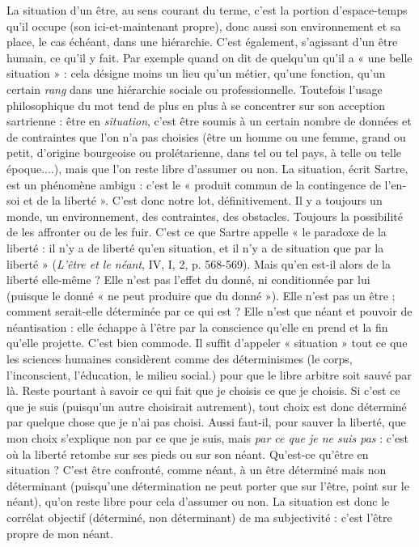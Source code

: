 La situation d’un être, au sens courant du terme, c’est la portion d’espace-temps
qu'il occupe (son ici-et-maintenant propre), donc aussi son environnement
et sa place, le cas échéant, dans une hiérarchie. C’est également, s'agissant
d’un être humain, ce qu’il y fait. Par exemple quand on dit de quelqu’un qu’il
a « une belle situation » : cela désigne moins un lieu qu’un métier, qu’une fonction,
qu’un certain {\it rang} dans une hiérarchie sociale ou professionnelle. Toutefois
l’usage philosophique du mot tend de plus en plus à se concentrer sur son
acception sartrienne : être en {\it situation}, c’est être soumis à un certain nombre de
données et de contraintes que l’on n’a pas choisies (être un homme ou une
femme, grand ou petit, d’origine bourgeoise ou prolétarienne, dans tel ou tel
pays, à telle ou telle époque....), mais que l’on reste libre d’assumer ou non. La
situation, écrit Sartre, est un phénomène ambigu : c’est le « produit commun
de la contingence de l’en-soi et de la liberté ». C’est donc notre lot, définitivement.
Il y a toujours un monde, un environnement, des contraintes, des obstacles.
Toujours la possibilité de les affronter ou de les fuir. C’est ce que Sartre
appelle « le paradoxe de la liberté : il n’y a de liberté qu’en situation, et il n’y a
de situation que par la liberté » ({\it L'être et le néant}, IV, I, 2, p. 568-569). Mais
qu’en est-il alors de la liberté elle-même ? Elle n’est pas l'effet du donné, ni
conditionnée par lui (puisque le donné « ne peut produire que du donné »).
Elle n’est pas un être ; comment serait-elle déterminée par ce qui est ? Elle n’est
que néant et pouvoir de néantisation : elle échappe à l’être par la conscience
qu’elle en prend et la fin qu’elle projette. C’est bien commode. Il suffit
d'appeler « situation » tout ce que les sciences humaines considèrent comme
des déterminismes (le corps, l'inconscient, l'éducation, le milieu social.) pour
que le libre arbitre soit sauvé par là. Reste pourtant à savoir ce qui fait que je
choisis ce que je choisis. Si c’est ce que je suis (puisqu’un autre choisirait autrement),
tout choix est donc déterminé par quelque chose que je n’ai pas choisi.
Aussi faut-il, pour sauver la liberté, que mon choix s'explique non par ce que je
suis, mais {\it par ce que je ne suis pas} : c’est où la liberté retombe sur ses pieds ou
sur son néant. Qu'est-ce qu'être en situation ? C’est être confronté, comme
néant, à un être déterminé mais non déterminant (puisqu’une détermination
ne peut porter que sur l'être, point sur le néant), qu’on reste libre pour cela
d'assumer ou non. La situation est donc le corrélat objectif (déterminé, non
déterminant) de ma subjectivité : c’est l’être propre de mon néant.

